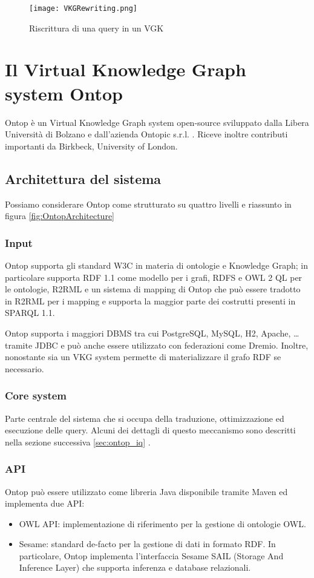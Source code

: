 \begin{figure}[ht]
    \centering
    \texttt{[image: VKGRewriting.png]}
    \caption{Riscrittura di una query in un VGK}
    \label{fig:VKGRewriting}
\end{figure}


\section{Il Virtual Knowledge Graph system Ontop}
\label{sec:vkg_ontop}
Ontop è un Virtual Knowledge Graph system open-source sviluppato dalla Libera Università di Bolzano e dall'azienda Ontopic s.r.l. . Riceve inoltre
contributi importanti da Birkbeck, University of London.

\subsection{Architettura del sistema}
Possiamo considerare Ontop come strutturato su quattro livelli e riassunto in figura \ref{fig:OntopArchitecture}
\subsubsection*{Input}
Ontop supporta gli standard W3C in materia di ontologie e Knowledge Graph; in particolare supporta RDF 1.1 come modello per i grafi, RDFS e OWL 2 QL per le
ontologie, R2RML e un sistema di mapping di Ontop che può essere tradotto in R2RML per i mapping e supporta la maggior parte dei costrutti presenti in SPARQL 1.1.

Ontop supporta i maggiori DBMS tra cui PostgreSQL, MySQL, H2, Apache, \dots tramite JDBC e può anche essere utilizzato con federazioni come Dremio.
Inoltre, nonostante sia un VKG system permette di materializzare il grafo RDF se necessario.

\subsubsection*{Core system}
Parte centrale del sistema che si occupa della traduzione, ottimizzazione ed esecuzione delle query. Alcuni dei dettagli di questo meccanismo sono descritti nella
sezione successiva \ref{sec:ontop_iq} \cite{OntopArchitecture}.
\subsubsection*{API}
Ontop può essere utilizzato come libreria Java disponibile tramite Maven ed implementa due API:
\begin{itemize}
    \item OWL API: implementazione di riferimento per la gestione di ontologie OWL.
    \item Sesame: standard de-facto per la gestione di dati in formato RDF. In particolare, Ontop implementa l'interfaccia Sesame SAIL (Storage And Inference Layer) che supporta 
        inferenza e database relazionali.
\end{itemize}
